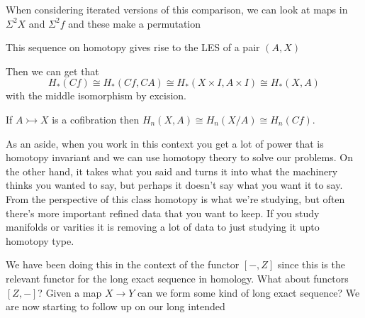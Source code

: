 \documentclass[12pt]{article}
\theoremstyle{definition}
\begin{document}
	When considering iterated versions of this comparison, we can look at maps in $\Sigma^2 X$ and $\Sigma^2 f$ and these make a permutation
	\begin{center}
		\end{center}
	This sequence on homotopy gives rise to the LES of a pair $(A,X)$
	\begin{center}
	\end{center}
	Then we can get that \[
	H_*(Cf)\cong H_*(Cf,CA)\cong H_*(X\times I, A\times I)\cong H_*(X,A)
	\]
	with the middle isomorphism by excision. 
	
	If $A\rightarrowtail X$ is a cofibration then $H_n(X,A)\cong H_n(X/A)\cong H_n(Cf)$. 
	
	As an aside, when you work in this context you get a lot of power that is homotopy invariant and we can use homotopy theory to solve our problems. On the other hand, it takes what you said and turns it into what the machinery thinks you wanted to say, but perhaps it doesn't say what you want it to say. From the perspective of this class homotopy is what we're studying, but often there's more important refined data that you want to keep. If you study manifolds or varities it is removing a lot of data to just studying it upto homotopy type. 
	
	We have been doing this in the context of the functor $[-,Z]$ since this is the relevant functor for the long exact sequence in homology. What about functors $[Z,-]$? Given a map $X\to Y$ can we form some kind of long exact sequence? We are now starting to follow up on our long intended 
	
\end{document}
